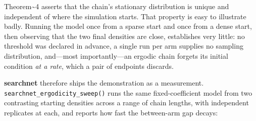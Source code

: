 \documentclass[
]{article}
\begin{document}
Theorem\textasciitilde4 asserts that the chain's stationary distribution
is unique and independent of where the simulation starts. That property
is easy to illustrate badly. Running the model once from a sparse start
and once from a dense start, then observing that the two final densities
are close, establishes very little: no threshold was declared in
advance, a single run per arm supplies no sampling distribution,
and---most importantly---an ergodic chain forgets its initial condition
\emph{at a rate}, which a pair of endpoints discards.

\textbf{searchnet} therefore ships the demonstration as a measurement.
\texttt{searchnet\_ergodicity\_sweep()} runs the same fixed-coefficient
model from two contrasting starting densities across a range of chain
lengths, with independent replicates at each, and reports how fast the
between-arm gap decays:
\end{document}

